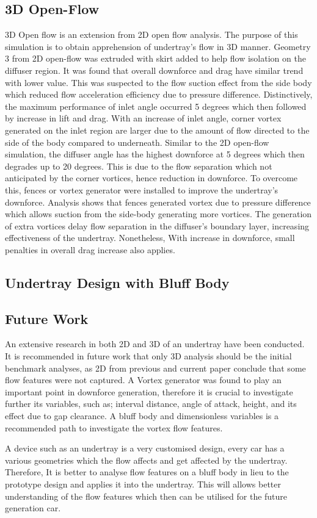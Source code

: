 \subsection*{3D Open-Flow}
3D Open flow is an extension from 2D open flow analysis. The purpose of this simulation is to obtain apprehension of undertray's flow in 3D manner. Geometry 3 from 2D open-flow was extruded with skirt added to help flow isolation on the diffuser region. It was found that overall downforce and drag have similar trend with lower value. This was suspected to the flow suction effect from the side body which reduced flow acceleration efficiency due to pressure difference. Distinctively, the maximum performance of inlet angle occurred 5 degrees which then followed by increase in lift and drag. With an increase of inlet angle, corner vortex generated on the inlet region are larger due to the amount of flow directed to the side of the body compared to underneath. Similar to the 2D open-flow simulation, the diffuser angle has the highest downforce at 5 degrees which then degrades up to 20 degrees. This is due to the flow separation which not anticipated by the corner vortices, hence reduction in downforce. To overcome this, fences or vortex generator were installed to improve the undertray's downforce. Analysis shows that fences generated vortex due to pressure difference which allows suction from the side-body generating more vortices. The generation of extra vortices delay flow separation in the diffuser's boundary layer, increasing effectiveness of the undertray. Nonetheless, With increase in downforce, small penalties in overall drag increase also applies.

\subsection*{Undertray Design with Bluff Body}


\subsection{Future Work}
\noindent An extensive research in both 2D and 3D of an undertray have been conducted. It is recommended in future work that only 3D analysis should be the initial benchmark analyses, as 2D from previous and current paper conclude that some flow features were not captured. A Vortex generator was found to play an important point in downforce generation, therefore it is crucial to investigate further its variables, such as; interval distance, angle of attack, height, and its effect due to gap clearance. A bluff body and dimensionless variables is a recommended path to investigate the vortex flow features.

\noindent A device such as an undertray is a very customised design, every car has a various geometries which the flow affects and get affected by the undertray. Therefore, It is better to analyse flow features on a bluff body in lieu to the prototype design and applies it into the undertray. This will allows better understanding of the flow features which then can be utilised for the future generation car.

